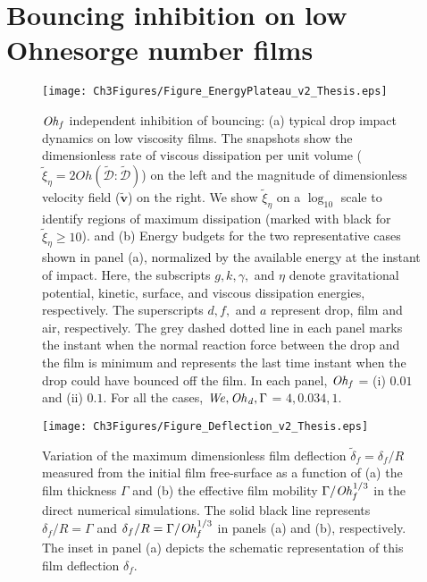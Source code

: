 \section{Bouncing inhibition on low Ohnesorge number films}
\label{sec:EnergySection}

\begin{figure}
	\centering
	\texttt{[image: Ch3Figures/Figure\_EnergyPlateau\_v2\_Thesis.eps]}
	\caption{$\mathit{Oh}_\mathit{f}$ independent inhibition of bouncing: (a) typical drop impact dynamics on low viscosity films. The snapshots show the dimensionless rate of viscous dissipation per unit volume ($\tilde{\xi}_\eta = 2Oh\left(\boldsymbol{\tilde{\mathcal{D}}:\tilde{\mathcal{D}}}\right)$) on the left and the magnitude of dimensionless velocity field ($\boldsymbol{\tilde{v}}$) on the right. We show $\tilde{\xi}_\eta$ on a $\log_{\text{10}}$ scale to identify regions of maximum dissipation (marked with black for $\tilde{\xi}_\eta \ge 10$).  and (b) Energy budgets for the two representative cases shown in panel (a), normalized by the available energy at the instant of impact. Here, the subscripts $g, k, \gamma,$ and $\eta$ denote gravitational potential, kinetic, surface, and viscous dissipation energies, respectively. The superscripts $d, f,$ and $a$ represent drop, film and air, respectively. The grey dashed dotted line in each panel marks the instant when the normal reaction force between the drop and the film is minimum and represents the last time instant when the drop could have bounced off the film. In each panel, $\mathit{Oh}_\mathit{f}$ = (i) $0.01$ and (ii) $0.1$. For all the cases, $\mathit{We}, \mathit{Oh}_\mathit{d}, \Gamma$ = $4, 0.034, 1$. }
	\label{fig:Plateau}
\end{figure}
\begin{figure}
	\centering
	\texttt{[image: Ch3Figures/Figure\_Deflection\_v2\_Thesis.eps]}
	\caption{Variation of the maximum dimensionless film deflection $\tilde{\delta}_f = \delta_f/R$ measured from the initial film free-surface as a function of (a) the film thickness $\Gamma$ and (b) the effective film mobility $\Gamma / \mathit{Oh}_\mathit{f}^{1/3}$ in the direct numerical simulations. The solid black line represents $\delta_f/R = \Gamma$ and $\delta_f/R = \Gamma/\mathit{Oh}_\mathit{f}^{1/3}$ in panels (a) and (b), respectively. The inset in panel (a) depicts the schematic representation of this film deflection $\delta_f$.}
	\label{fig:Deflection}
\end{figure}

